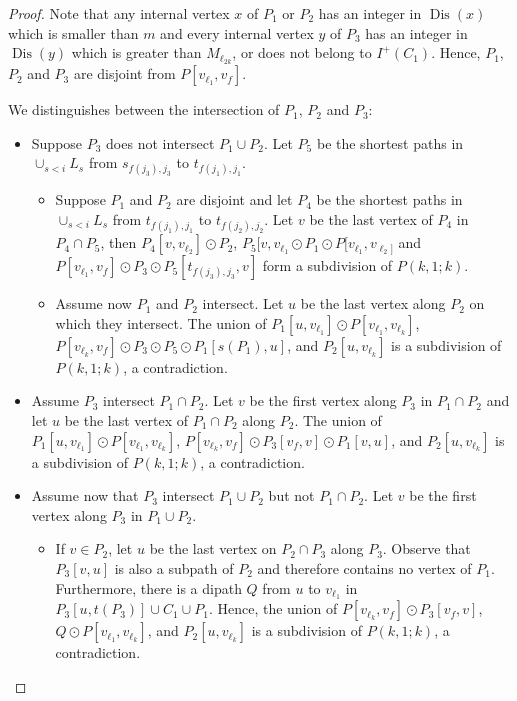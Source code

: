 \documentclass[utf8,10pt]{article}
\theoremstyle{plain}
\theoremstyle{definition}
\theoremstyle{remark}
\DeclareMathOperator{\Dis}{Dis}
\begin{document}
\begin{proof}
Note that any internal vertex $x$ of $P_1$ or $P_2$ has an integer in $\Dis(x)$
which is smaller than $m$ and every internal vertex $y$ of $P_3$ has an integer in $\Dis(y)$ which
is greater than $M_{\ell_{2k}}$, or does not belong to $I^+(C_1)$. Hence, 
$P_1$, $P_2$ and $P_3$ are disjoint from $P[v_{\ell_1},v_f]$. 

We distinguishes between the intersection of $P_1$, $P_2$ and $P_3$:

\begin{itemize}
	\item Suppose $P_3$ does not intersect $P_1 \cup P_2$. Let $P_5$ be the shortest paths in $\cup_{s < i} L_s$ from $s_{f(j_3),j_3}$ to $t_{f(j_1),j_1}$.
	\begin{itemize}
		\item Suppose $P_1$ and $P_2$ are disjoint and let $P_4$ be the shortest paths in $\cup_{s < i} L_s$ 
from $t_{f(j_1),j_1}$ to $t_{f(j_2),j_2}$. Let $v$ be the last vertex of $P_4$ in $P_4 \cap P_5$, then $P_4[v,v_{\ell_2}] \odot P_2$,
$P_5[v, v_{\ell_1} \odot P_1 \odot P[v_{\ell_1}, v_{\ell_2]}$ and $P[v_{\ell_1}, v_f] \odot P_3 \odot P_5[t_{f(j_3),j_3}, v]$
form a subdivision of $P(k,1;k)$.
	
		\item Assume now $P_1$ and $P_2$ intersect. Let $u$ be the last vertex along $P_2$ on which they intersect.
		 The union of $P_1[u,v_{\ell_1}]\odot P[v_{\ell_1}, v_{\ell_k}]$, $P[v_{\ell_k}, v_f]\odot P_3\odot P_5 \odot P_1[s(P_1), u]$, and $P_2[u, v_{\ell_k}]$ is a subdivision of $P(k,1;k)$, a contradiction.
	\end{itemize}

	\item Assume $P_3$ intersect $P_1\cap P_2$. Let $v$ be the first vertex along $P_3$ in $P_1\cap P_2$ and let $u$ be the last vertex of $P_1\cap P_2$ along $P_2$. The union of $P_1[u,v_{\ell_1}]\odot P[v_{\ell_1}, v_{\ell_k}]$, $P[v_{\ell_k}, v_f]\odot P_3[v_f,v]\odot P_1[v, u]$, and $P_2[u, v_{\ell_k}]$ is a subdivision of $P(k,1;k)$, a contradiction.

	\item Assume now that $P_3$ intersect $P_1\cup P_2$ but not $P_1\cap P_2$. Let $v$ be the first vertex along $P_3$ in $P_1\cup P_2$.
	\begin{itemize}
	\item If $v \in P_2$, let $u$ be the last vertex on $P_2\cap P_3$ along $P_3$. Observe that $P_3[v,u]$ is also a subpath of $P_2$ and therefore contains no vertex of $P_1$. Furthermore, there is a dipath $Q$ from $u$ to $v_{\ell_1}$ in $P_3[u, t(P_3)]\cup C_1\cup  P_1$. Hence, the union of $P[v_{\ell_k}, v_f] \odot P_3[v_f,v]$, $Q\odot P[v_{\ell_1},v_{\ell_k}]$, and $P_2[u,v_{\ell_k}]$ is a subdivision of $P(k,1;k)$, a contradiction.
	

\end{itemize}
\end{itemize}
\end{proof}
\end{document}
